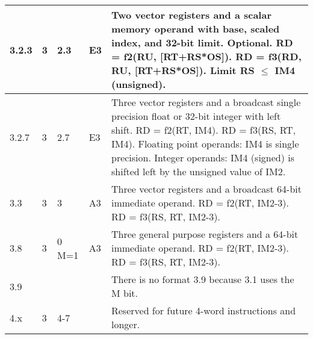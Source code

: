 \documentclass[forwardcom.tex]{subfiles}
\begin{document}
\begin{longtable} {|p{10mm}|p{6mm}|p{9mm}|p{7mm}|p{80mm}|}
\hline
3.2.3 & 3 & 2.3 & E3 & Two vector registers and a scalar memory operand with base, scaled index, and 32-bit limit. Optional. \newline 
RD = f2(RU, [RT+RS*OS]). \newline 
RD = f3(RD, RU, [RT+RS*OS]). \newline 
Limit RS $\leq$ IM4 (unsigned).\\

\hline
3.2.7 & 3 & 2.7 & E3 & Three vector registers and a broadcast single precision float or 32-bit integer with left shift.\newline 
RD = f2(RT, IM4). \newline 
RD = f3(RS, RT, IM4).\newline
Floating point operands: IM4 is single precision.
Integer operands: IM4 (signed) is shifted left by the unsigned value of IM2. \\

\hline
3.3 & 3 & 3 & A3 & Three vector registers and a broadcast 64-bit immediate operand.\newline 
RD = f2(RT, IM2-3). \newline 
RD = f3(RS, RT, IM2-3).\\

\hline
3.8 & 3 & 0 M=1 & A3 & Three general purpose registers and a 64-bit immediate operand. \newline 
RD = f2(RT, IM2-3). \newline 
RD = f3(RS, RT, IM2-3).\\

\hline
3.9 &  &  &  & There is no format 3.9 because 3.1 uses the M bit.\\

\hline
4.x & 3 & 4-7 &  & Reserved for future 4-word instructions and longer. \\
\hline
\end{longtable}


\end{document}
